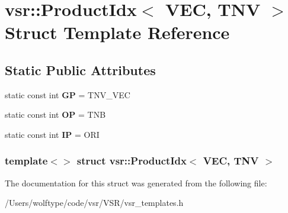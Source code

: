 \hypertarget{structvsr_1_1_product_idx_3_01_v_e_c_00_01_t_n_v_01_4}{\section{vsr\-:\-:Product\-Idx$<$ V\-E\-C, T\-N\-V $>$ Struct Template Reference}
\label{structvsr_1_1_product_idx_3_01_v_e_c_00_01_t_n_v_01_4}
}
\subsection*{Static Public Attributes}
\begin{DoxyCompactItemize}
\item 
\hypertarget{structvsr_1_1_product_idx_3_01_v_e_c_00_01_t_n_v_01_4_a7d8dd057690c2d219fe88f13014054f3}{static const int {\bfseries G\-P} = T\-N\-V\-\_\-\-V\-E\-C}\label{structvsr_1_1_product_idx_3_01_v_e_c_00_01_t_n_v_01_4_a7d8dd057690c2d219fe88f13014054f3}

\item 
\hypertarget{structvsr_1_1_product_idx_3_01_v_e_c_00_01_t_n_v_01_4_abc201db7232d9b239dea3615d958f714}{static const int {\bfseries O\-P} = T\-N\-B}\label{structvsr_1_1_product_idx_3_01_v_e_c_00_01_t_n_v_01_4_abc201db7232d9b239dea3615d958f714}

\item 
\hypertarget{structvsr_1_1_product_idx_3_01_v_e_c_00_01_t_n_v_01_4_a3926e670d323e5835036c618dd7bba48}{static const int {\bfseries I\-P} = O\-R\-I}\label{structvsr_1_1_product_idx_3_01_v_e_c_00_01_t_n_v_01_4_a3926e670d323e5835036c618dd7bba48}

\end{DoxyCompactItemize}
\subsubsection*{template$<$$>$ struct vsr\-::\-Product\-Idx$<$ V\-E\-C, T\-N\-V $>$}



The documentation for this struct was generated from the following file\-:\begin{DoxyCompactItemize}
\item 
/\-Users/wolftype/code/vsr/\-V\-S\-R/vsr\-\_\-templates.\-h\end{DoxyCompactItemize}
